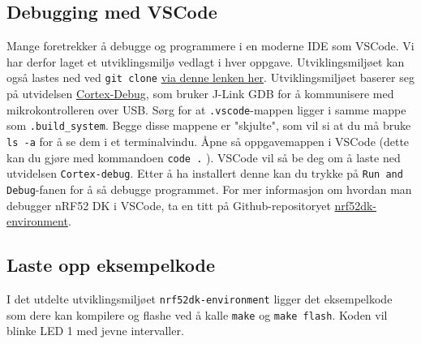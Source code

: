 \subsection*{Debugging med VSCode}

Mange foretrekker å debugge og programmere i en moderne IDE som VSCode. Vi har derfor laget et utviklingsmiljø vedlagt i hver oppgave. Utviklingsmiljøet kan også lastes ned ved \verb|git clone| \href{https://github.com/ITK-TTK4235/nrf52dk-environment}{via denne lenken her}. Utviklingsmiljøet baserer seg på utvidelsen \href{https://open-vsx.org/extension/marus25/cortex-debug}{Cortex-Debug}, som bruker J-Link GDB for å kommunisere med mikrokontrolleren over USB. Sørg for at \verb|.vscode|-mappen ligger i samme mappe som \verb|.build_system|. Begge disse mappene er "skjulte", som vil si at du må bruke \verb|ls -a| for å se dem i et terminalvindu. Åpne så oppgavemappen i VSCode (dette kan du gjøre med kommandoen \verb|code .| ). VSCode vil så be deg om å laste ned utvidelsen \verb|Cortex-debug|. Etter å ha installert denne kan du trykke på \verb|Run and Debug|-fanen for å så debugge programmet. For mer informasjon om hvordan man debugger nRF52 DK i VSCode, ta en titt på Github-repositoryet \href{https://github.com/ITK-TTK4235/nrf52dk-environment}{nrf52dk-environment}.

\subsection{Laste opp eksempelkode}
I det utdelte utviklingsmiljøet \verb|nrf52dk-environment| ligger det eksempelkode som dere kan kompilere og flashe ved å kalle \verb|make| og \verb|make flash|. Koden vil blinke LED 1 med jevne intervaller. 


